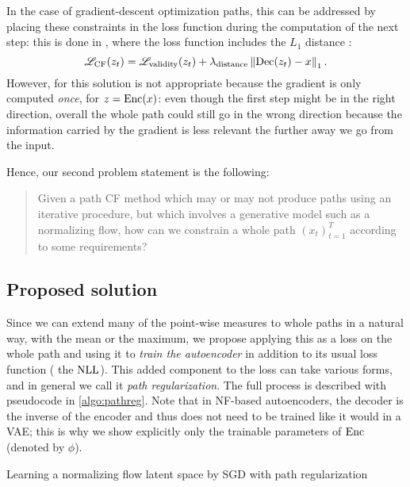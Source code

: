 \documentclass[../main.tex]{subfiles}
\begin{document}
In the case of gradient-descent optimization paths, this can be addressed by placing these constraints in the loss function during the computation of the next step: this is done in \revise{}, where the loss function includes the $L_1$ distance \cite{joshiRealistic2019}:
\begin{equation*}
\mathscr{L}_\text{CF}(z_t) = \mathscr{L}_\text{validity}(z_t) + \lambda_\text{distance} \left\lVert\operatorname{Dec}(z_t) - x\right\rVert_1.
\end{equation*}
However, for \ls{} this solution is not appropriate because the gradient is only computed \emph{once}, for $z = \operatorname{Enc}(x)$: even though the first step might be in the right direction, overall the whole path could still go in the wrong direction because the information carried by the gradient is less relevant the further away we go from the input.

Hence, our second problem statement is the following:
\begin{quote}
Given a path CF method which may or may not produce paths using an iterative procedure, but which involves a generative model such as a normalizing flow,
how can we constrain a whole path $(x_t)_{t=1}^T$ according to some requirements?
\end{quote}

\subsection{Proposed solution}

Since we can extend many of the point-wise measures to whole paths in a natural way, \eg{} with the mean or the maximum, we propose applying this as a loss on the whole path and using it to \emph{train the autoencoder} in addition to its usual loss function (\eg{} the $\text{NLL}$).
This added component to the loss can take various forms, and in general we call it \emph{path regularization}.
The full process is described with pseudocode in \autoref{algo:pathreg}.
Note that in NF-based autoencoders, the decoder is the inverse of the encoder and thus does not need to be trained like it would in a VAE; this is why we show explicitly only the trainable parameters of $\operatorname{Enc}$ (denoted by $\phi$).

\begin{algorithm}
\caption{Learning a normalizing flow latent space by SGD with path regularization}
\label{algo:pathreg}
\end{algorithm}
\end{document}
